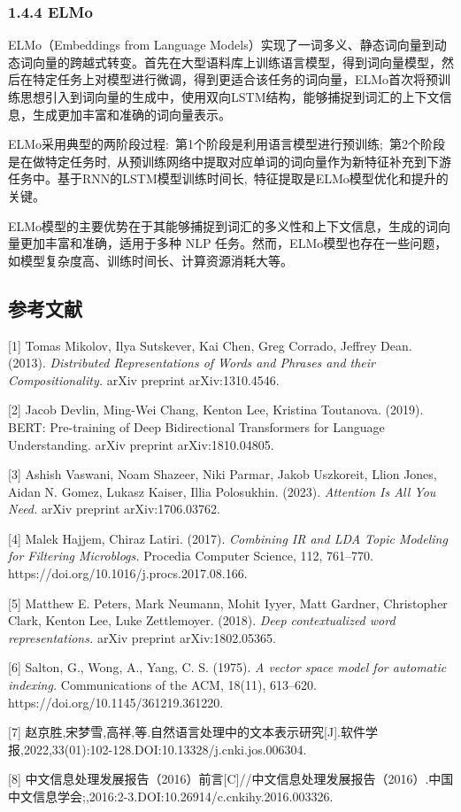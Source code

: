 \documentclass[
]{article}
\begin{document}
\subsubsection{1.4.4 ELMo}\label{elmo}

ELMo（Embeddings from Language
Models）实现了一词多义、静态词向量到动态词向量的跨越式转变。首先在大型语料库上训练语言模型，得到词向量模型，然后在特定任务上对模型进行微调，得到更适合该任务的词向量，ELMo首次将预训练思想引入到词向量的生成中，使用双向LSTM结构，能够捕捉到词汇的上下文信息，生成更加丰富和准确的词向量表示。

ELMo采用典型的两阶段过程:~第1个阶段是利用语言模型进行预训练;~第2个阶段是在做特定任务时,~从预训练网络中提取对应单词的词向量作为新特征补充到下游任务中。基于RNN的LSTM模型训练时间长,~特征提取是ELMo模型优化和提升的关键。

ELMo模型的主要优势在于其能够捕捉到词汇的多义性和上下文信息，生成的词向量更加丰富和准确，适用于多种
NLP
任务。然而，ELMo模型也存在一些问题，如模型复杂度高、训练时间长、计算资源消耗大等。

\subsection{参考文献}\label{ux53c2ux8003ux6587ux732e}

{[}1{]} Tomas Mikolov, Ilya Sutskever, Kai Chen, Greg Corrado, Jeffrey
Dean. (2013). \emph{Distributed Representations of Words and Phrases and
their Compositionality.} arXiv preprint arXiv:1310.4546.

{[}2{]} Jacob Devlin, Ming-Wei Chang, Kenton Lee, Kristina Toutanova.
(2019). BERT: Pre-training of Deep Bidirectional Transformers for
Language Understanding. arXiv preprint arXiv:1810.04805.

{[}3{]} Ashish Vaswani, Noam Shazeer, Niki Parmar, Jakob Uszkoreit,
Llion Jones, Aidan N. Gomez, Lukasz Kaiser, Illia Polosukhin. (2023).
\emph{Attention Is All You Need.} arXiv preprint arXiv:1706.03762.

{[}4{]} Malek Hajjem, Chiraz Latiri. (2017). \emph{Combining IR and LDA
Topic Modeling for Filtering Microblogs.} Procedia Computer Science,
112, 761--770. https://doi.org/10.1016/j.procs.2017.08.166.

{[}5{]} Matthew E. Peters, Mark Neumann, Mohit Iyyer, Matt Gardner,
Christopher Clark, Kenton Lee, Luke Zettlemoyer. (2018). \emph{Deep
contextualized word representations.} arXiv preprint arXiv:1802.05365.

{[}6{]} Salton, G., Wong, A., Yang, C. S. (1975). \emph{A vector space
model for automatic indexing.} Communications of the ACM, 18(11),
613--620. https://doi.org/10.1145/361219.361220.

{[}7{]}
赵京胜,宋梦雪,高祥,等.自然语言处理中的文本表示研究{[}J{]}.软件学报,2022,33(01):102-128.DOI:10.13328/j.cnki.jos.006304.

{[}8{]}
中文信息处理发展报告（2016）前言{[}C{]}//中文信息处理发展报告（2016）.中国中文信息学会;,2016:2-3.DOI:10.26914/c.cnkihy.2016.003326.
\end{document}
